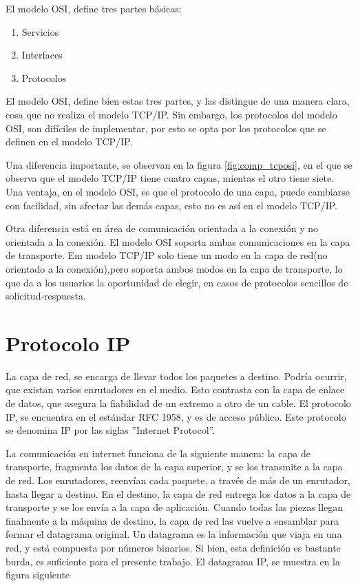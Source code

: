 El modelo OSI, define tres partes básicas: 
\begin{enumerate}
	\item Servicios 
	\item Interfaces 
	\item Protocolos
\end{enumerate}

El modelo OSI, define bien estas tres partes, y las distingue de una manera clara, cosa que no realiza el modelo TCP/IP. Sin embargo, los protocolos del modelo OSI, son difíciles de implementar, por esto se opta por los protocolos que se definen en el modelo TCP/IP. 

Una diferencia importante, se observan en la figura \ref{fig:comp_tcposi}, en el que se observa que el modelo TCP/IP tiene cuatro capas, mientas el otro tiene siete. Una ventaja, en el modelo OSI, es que el protocolo de una capa, puede cambiarse con facilidad, sin afectar las demás capas, esto no es así en el modelo TCP/IP. 

Otra diferencia está en área de comunicación orientada a la conexión y no orientada a la conexión. El modelo OSI soporta ambas comunicaciones en la capa de transporte. Em modelo TCP/IP solo tiene un modo en la capa de red(no orientado a la conexión),pero soporta ambos modos en la capa de transporte, lo que da a los usuarios la oportunidad de elegir, en casos de protocolos sencillos de solicitud-respuesta.  




\section{Protocolo IP} 
La capa de red, se encarga de llevar todos los paquetes a destino. Podría ocurrir, que existan varios enrutadores en el medio. Esto contrasta con la capa de enlace de datos, que asegura la fiabilidad de un extremo a otro de un cable. El protocolo IP, se encuentra en el estándar RFC 1958, y es de acceso público. Este protocolo se denomina IP por las siglas ''Internet Protocol''. 

La comunicación en internet funciona de la siguiente manera: la capa de transporte, fragmenta los datos de la capa superior, y se los transmite a la capa de red. Los enrutadores, reenvían cada paquete, a través de más de un enrutador, hasta llegar a destino. En el destino, la capa de red entrega los datos a la capa de transporte y se los envía a la capa de aplicación. Cuando todas las piezas llegan finalmente a la máquina de destino, la capa de red las vuelve a ensamblar para formar el datagrama original. Un datagrama es la información que viaja en una red, y está compuesta por números binarios. Si bien, esta definición es bastante burda, es suficiente para el presente trabajo. El datagrama IP, se muestra en la figura siguiente 

